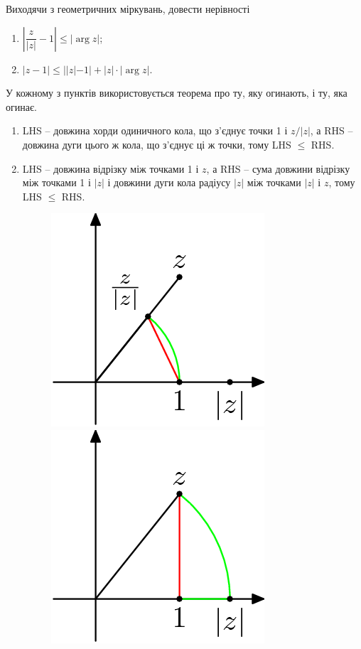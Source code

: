 \setcounter{problem}{7}
\begin{problem}
	Виходячи з геометричних міркувань, довести нерівності
	\begin{multicols}{2}
		\begin{enumerate}
			\item $\left| \dfrac{z}{|z|} - 1 \right| \le |\arg z|$;
			\item $|z - 1| \le | |z| - 1 | + |z| \cdot |\arg z|$.
		\end{enumerate}
	\end{multicols}
\end{problem}
\begin{solution}
	У кожному з пунктів використовується теорема про ту, яку огинають, і ту, яка огинає.
	\begin{enumerate}
		\item LHS -- довжина хорди одиничного кола, що з'єднує точки 1 і $z/|z|$, а RHS -- довжина дуги цього ж кола, що з'єднує ці ж точки, тому LHS $\le$ RHS.
		\item LHS -- довжина відрізку між точками 1 і $z$, а RHS -- сума довжини відрізку між точками 1 і $|z|$ і довжини дуги кола радіусу $|z|$ між точками $|z|$ і $z$, тому LHS $\le$ RHS.
		\begin{figure}[H]
			\centering
			\includegraphics[width=.45\linewidth]{fig-1.png} \qquad
			\includegraphics[width=.45\linewidth]{fig-2.png}
		\end{figure}
	\end{enumerate}
\end{solution}


